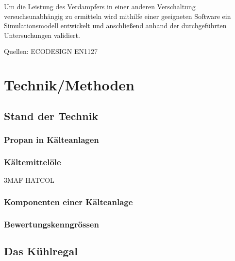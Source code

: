 Um die Leistung des Verdampfers in einer anderen Verschaltung versuchsunabhängig zu ermitteln wird mithilfe einer geeigneten Software ein Simulationsmodell entwickelt und anschließend anhand der durchgeführten Untersuchungen validiert.

Quellen:
ECODESIGN
EN1127


\chapter{Technik/Methoden}
\label{cha:Technik}

\section{Stand der Technik}
\label{sec:Stand der Technik}

\subsection{Propan in Kälteanlagen}
\label{subsec:Propan in Kälteanlagen}



\subsection{Kältemittelöle}
\label{subsec:Kältemitteloele}


3MAF HATCOL


\subsection{Komponenten einer Kälteanlage}
\label{subsec:Komponenten einer Kälteanlage}

\subsection{Bewertungskenngrössen}
\label{subsec:Bewertungskenngrössen}

\section{Das Kühlregal}
\label{sec:Das Kühlregal}

